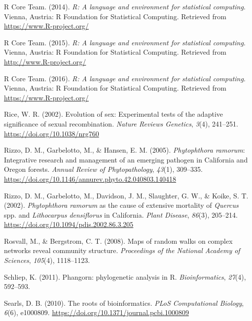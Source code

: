 \documentclass[double,11pt]{beavtex}
\begin{document}
  \hypertarget{ref-R2014}{}
  R Core Team. (2014). \emph{R: A language and environment for statistical
  computing}. Vienna, Austria: R Foundation for Statistical Computing.
  Retrieved from \url{https://www.R-project.org/}
  
  \hypertarget{ref-R}{}
  R Core Team. (2015). \emph{R: A language and environment for statistical
  computing}. Vienna, Austria: R Foundation for Statistical Computing.
  Retrieved from \url{http://www.R-project.org/}
  
  \hypertarget{ref-R2016}{}
  R Core Team. (2016). \emph{R: A language and environment for statistical
  computing}. Vienna, Austria: R Foundation for Statistical Computing.
  Retrieved from \url{https://www.R-project.org/}
  
  \hypertarget{ref-rice2002evolution}{}
  Rice, W. R. (2002). Evolution of sex: Experimental tests of the adaptive
  significance of sexual recombination. \emph{Nature Reviews Genetics},
  \emph{3}(4), 241--251. \url{https://doi.org/10.1038/nrg760}
  
  \hypertarget{ref-rizzo2005phytophthora}{}
  Rizzo, D. M., Garbelotto, M., \& Hansen, E. M. (2005).
  \emph{Phytophthora ramorum}: Integrative research and management of an
  emerging pathogen in California and Oregon forests. \emph{Annual Review
  of Phytopathology}, \emph{43}(1), 309--335.
  \url{https://doi.org/10.1146/annurev.phyto.42.040803.140418}
  
  \hypertarget{ref-rizzo2002phytophthora}{}
  Rizzo, D. M., Garbelotto, M., Davidson, J. M., Slaughter, G. W., \&
  Koike, S. T. (2002). \emph{Phytophthora ramorum} as the cause of
  extensive mortality of \emph{Quercus} spp. and \emph{Lithocarpus
  densiflorus} in California. \emph{Plant Disease}, \emph{86}(3),
  205--214. \url{https://doi.org/10.1094/pdis.2002.86.3.205}
  
  \hypertarget{ref-rosvall2008maps}{}
  Rosvall, M., \& Bergstrom, C. T. (2008). Maps of random walks on complex
  networks reveal community structure. \emph{Proceedings of the National
  Academy of Sciences}, \emph{105}(4), 1118--1123.
  
  \hypertarget{ref-phangorn}{}
  Schliep, K. (2011). Phangorn: phylogenetic analysis in R.
  \emph{Bioinformatics}, \emph{27}(4), 592--593.
  
  \hypertarget{ref-searls2010roots}{}
  Searls, D. B. (2010). The roots of bioinformatics. \emph{PLoS
  Computational Biology}, \emph{6}(6), e1000809.
  \url{https://doi.org/10.1371/journal.pcbi.1000809}
  
\end{document}
